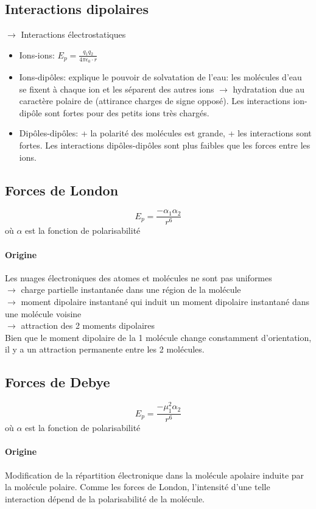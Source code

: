 \subsection{Interactions dipolaires}
$\rightarrow$ Interactions électrostatiques
\begin{itemize}
  \item Ions-ions: $E_p=\frac{q_1q_2}{4\pi\epsilon_0\cdot r}$
  \item Ions-dipôles: explique le pouvoir de solvatation de l'eau: les molécules d'eau se fixent à chaque ion et les séparent des autres ions $\rightarrow$ hydratation due au caractère polaire de  (attirance charges de signe opposé).
    Les interactions ion-dipôle sont fortes pour des petits ions très chargés.
  \item Dipôles-dipôles: + la polarité des molécules est grande,
    + les interactions sont fortes.
    Les interactions dipôles-dipôles sont plus faibles que les forces entre les ions.
\end{itemize}

\subsection{Forces de London}
\[ E_p = \frac{-\alpha_1 \alpha_2}{r^6} \]
où $\alpha$ est la fonction de polarisabilité

\paragraph{Origine}
Les nuages électroniques des atomes et molécules ne sont pas uniformes\\ $\rightarrow$ charge partielle instantanée dans une région de la molécule\\ $\rightarrow$ moment dipolaire instantané qui induit un moment dipolaire instantané dans une molécule voisine\\ $\rightarrow$ attraction des 2 moments dipolaires\\
Bien que le moment dipolaire de la 1 molécule change constamment d'orientation,
il y a un attraction permanente entre les 2 molécules.

\subsection{Forces de Debye}
\[ E_p = \frac{-\mu_1^2 \alpha_2}{r^6} \]
où $\alpha$ est la fonction de polarisabilité

\paragraph{Origine}
Modification de la répartition électronique dans la molécule apolaire induite par la molécule polaire.
Comme les forces de London,
l'intensité d'une telle interaction dépend de la polarisabilité de la molécule.

